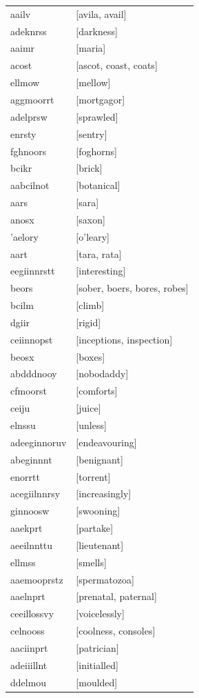 \documentclass{article}
\begin{document}
\begin{tabular}{ll}
aailv & [avila, avail] \\
adeknrss & [darkness] \\
aaimr & [maria] \\
acost & [ascot, coast, coats] \\
ellmow & [mellow] \\
aggmoorrt & [mortgagor] \\
adelprsw & [sprawled] \\
enrsty & [sentry] \\
fghnoors & [foghorns] \\
bcikr & [brick] \\
aabcilnot & [botanical] \\
aars & [sara] \\
anosx & [saxon] \\
'aelory & [o'leary] \\
aart & [tara, rata] \\
eegiinnrstt & [interesting] \\
beors & [sober, boers, bores, robes] \\
bcilm & [climb] \\
dgiir & [rigid] \\
ceiinnopst & [inceptions, inspection] \\
beosx & [boxes] \\
abdddnooy & [nobodaddy] \\
cfmoorst & [comforts] \\
ceiju & [juice] \\
elnssu & [unless] \\
adeeginnoruv & [endeavouring] \\
abeginnnt & [benignant] \\
enorrtt & [torrent] \\
acegiilnnrsy & [increasingly] \\
ginnoosw & [swooning] \\
aaekprt & [partake] \\
aeeilnnttu & [lieutenant] \\
ellmss & [smells] \\
aaemooprstz & [spermatozoa] \\
aaelnprt & [prenatal, paternal] \\
ceeillossvy & [voicelessly] \\
celnooss & [coolness, consoles] \\
aaciinprt & [patrician] \\
adeiiillnt & [initialled] \\
ddelmou & [moulded] \\

\end{tabular}
\end{document}
